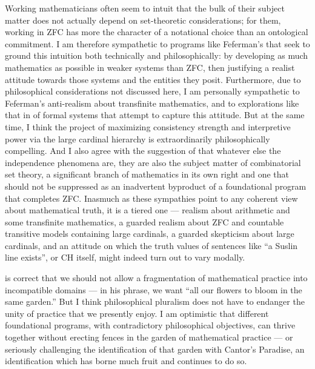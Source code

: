 \documentclass[letterpaper,12pt]{article}
\begin{document}
Working mathematicians often seem to intuit that the bulk of their subject matter does not actually depend on set-theoretic considerations; for them, working in ZFC has more the character of a notational choice than an ontological commitment. I am therefore sympathetic to programs like Feferman's \citeyearpar{feferman1992little} that seek to ground this intuition both technically and philosophically: by developing as much mathematics as possible in weaker systems than ZFC, then justifying a realist attitude towards those systems and the entities they posit. Furthermore, due to philosophical considerations not discussed here, I am personally sympathetic to Feferman's anti-realism about transfinite mathematics, and to explorations like that in \cite{rathjen2014indefiniteness} of formal systems that attempt to capture this attitude. But at the same time, I think the project of maximizing consistency strength and interpretive power via the large cardinal hierarchy is extraordinarily philosophically compelling. And I also agree with the suggestion of \cite{cummings2012challenges} that whatever else the independence phenomena are, they are also the subject matter of combinatorial set theory, a significant branch of mathematics in its own right and one that should not be suppressed as an inadvertent byproduct of a foundational program that completes ZFC. Inasmuch as these sympathies point to any coherent view about mathematical truth, it is a tiered one --- realism about arithmetic and some transfinite mathematics, a guarded realism about ZFC and countable transitive models containing large cardinals, a guarded skepticism about large cardinals, and an attitude on which the truth values of sentences like ``a Suslin line exists'', or CH itself, might indeed turn out to vary modally.

\cite{steel2012godel} is correct that we should not allow a fragmentation of mathematical practice into incompatible domains --- in his phrase, we want ``all our flowers to bloom in the same garden.'' But I think philosophical pluralism does not have to endanger the unity of practice that we presently enjoy. I am optimistic that different foundational programs, with contradictory philosophical objectives, can thrive together without erecting fences in the garden of mathematical practice --- or seriously challenging the identification of that garden with Cantor's Paradise, an identification which has borne much fruit and continues to do so.
\end{document}

